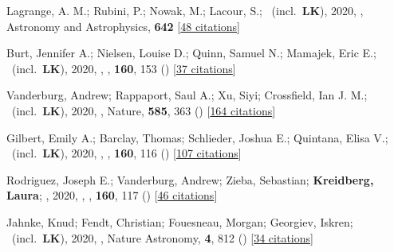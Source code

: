 \item[{\color{numcolor}\scriptsize42}] Lagrange, A. M.; Rubini, P.; Nowak, M.; Lacour, S.; \etal\ (incl.\ \textbf{LK}), 2020, , Astronomy and Astrophysics, \textbf{642} [\href{https://ui.adsabs.harvard.edu/abs/2020A&A...642A..18L}{48 citations}]

\item[{\color{numcolor}\scriptsize41}] Burt, Jennifer A.; Nielsen, Louise D.; Quinn, Samuel N.; Mamajek, Eric E.; \etal\ (incl.\ \textbf{LK}), 2020, , \aj, \textbf{160}, 153 () [\href{https://ui.adsabs.harvard.edu/abs/2020AJ....160..153B}{37 citations}]

\item[{\color{numcolor}\scriptsize40}] Vanderburg, Andrew; Rappaport, Saul A.; Xu, Siyi; Crossfield, Ian J. M.; \etal\ (incl.\ \textbf{LK}), 2020, , Nature, \textbf{585}, 363 () [\href{https://ui.adsabs.harvard.edu/abs/2020Natur.585..363V}{164 citations}]

\item[{\color{numcolor}\scriptsize39}] Gilbert, Emily A.; Barclay, Thomas; Schlieder, Joshua E.; Quintana, Elisa V.; \etal\ (incl.\ \textbf{LK}), 2020, , \aj, \textbf{160}, 116 () [\href{https://ui.adsabs.harvard.edu/abs/2020AJ....160..116G}{107 citations}]

\item[{\color{numcolor}\scriptsize38}] Rodriguez, Joseph E.; Vanderburg, Andrew; Zieba, Sebastian; \textbf{Kreidberg, Laura}; \etal, 2020, , \aj, \textbf{160}, 117 () [\href{https://ui.adsabs.harvard.edu/abs/2020AJ....160..117R}{46 citations}]

\item[{\color{numcolor}\scriptsize37}] Jahnke, Knud; Fendt, Christian; Fouesneau, Morgan; Georgiev, Iskren; \etal\ (incl.\ \textbf{LK}), 2020, , Nature Astronomy, \textbf{4}, 812 () [\href{https://ui.adsabs.harvard.edu/abs/2020NatAs...4..812J}{34 citations}]

